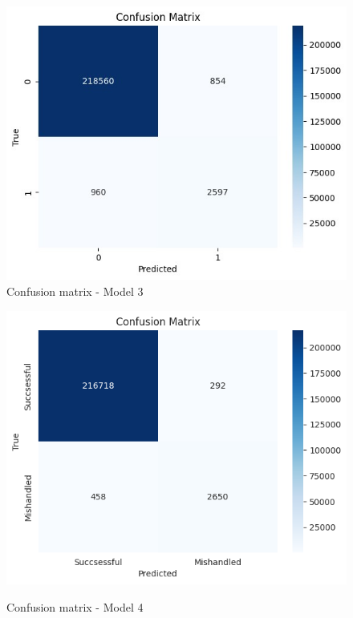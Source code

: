 \documentclass[12pt]{article}
\begin{document}
\begin{figure}
\begin{minipage}[c]{0.45\linewidth}
\includegraphics[width=1\textwidth]{Confusion_matrix_Model 3.jpg}\\
\caption{Confusion matrix - Model 3}
\end{minipage}
\hfill
\begin{minipage}[c]{0.45\linewidth}
    \includegraphics[width=1\textwidth]{Confusion_matrix_Model 4.png}\\
    \caption{Confusion matrix - Model 4}
\end{minipage}%
\end{figure}
\end{document}
